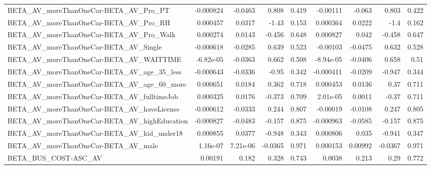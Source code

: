 \begin{tabular}{lrrrrrrrr}
BETA\_AV\_moreThanOneCar-BETA\_AV\_Pro\_PT              &   -0.000824 &      -0.0463 &    0.808 &    0.419 &   -0.00111 &      -0.063 &        0.803 &         0.422 \\
BETA\_AV\_moreThanOneCar-BETA\_AV\_Pro\_RH              &    0.000457 &       0.0317 &    -1.43 &    0.153 &   0.000364 &      0.0222 &         -1.4 &         0.162 \\
BETA\_AV\_moreThanOneCar-BETA\_AV\_Pro\_Walk            &    0.000274 &       0.0143 &   -0.456 &    0.648 &   0.000827 &       0.042 &       -0.458 &         0.647 \\
BETA\_AV\_moreThanOneCar-BETA\_AV\_Single              &   -0.000618 &      -0.0285 &    0.639 &    0.523 &   -0.00103 &     -0.0475 &        0.632 &         0.528 \\
BETA\_AV\_moreThanOneCar-BETA\_AV\_WAITTIME            &   -6.82e-05 &      -0.0363 &    0.662 &    0.508 &  -8.94e-05 &     -0.0406 &        0.658 &          0.51 \\
BETA\_AV\_moreThanOneCar-BETA\_AV\_age\_35\_less         &   -0.000643 &      -0.0336 &    -0.95 &    0.342 &  -0.000411 &     -0.0209 &       -0.947 &         0.344 \\
BETA\_AV\_moreThanOneCar-BETA\_AV\_age\_60\_more         &    0.000651 &       0.0184 &    0.362 &    0.718 &   0.000453 &      0.0136 &         0.37 &         0.711 \\
BETA\_AV\_moreThanOneCar-BETA\_AV\_fulltimeJob         &    0.000325 &       0.0176 &   -0.373 &    0.709 &   2.01e-05 &      0.0011 &        -0.37 &         0.711 \\
BETA\_AV\_moreThanOneCar-BETA\_AV\_haveLicense         &   -0.000612 &      -0.0333 &    0.244 &    0.807 &   -0.00019 &     -0.0108 &        0.247 &         0.805 \\
BETA\_AV\_moreThanOneCar-BETA\_AV\_highEducation       &   -0.000827 &      -0.0483 &   -0.157 &    0.875 &  -0.000963 &     -0.0585 &       -0.157 &         0.875 \\
BETA\_AV\_moreThanOneCar-BETA\_AV\_kid\_under18         &    0.000855 &       0.0377 &   -0.948 &    0.343 &   0.000806 &       0.035 &       -0.941 &         0.347 \\
BETA\_AV\_moreThanOneCar-BETA\_AV\_male                &    1.16e-07 &     7.21e-06 &  -0.0365 &    0.971 &   0.000153 &     0.00992 &      -0.0367 &         0.971 \\
BETA\_BUS\_COST-ASC\_AV                               &     0.00191 &        0.182 &    0.328 &    0.743 &     0.0038 &       0.213 &         0.29 &         0.772 \\

\end{tabular}
